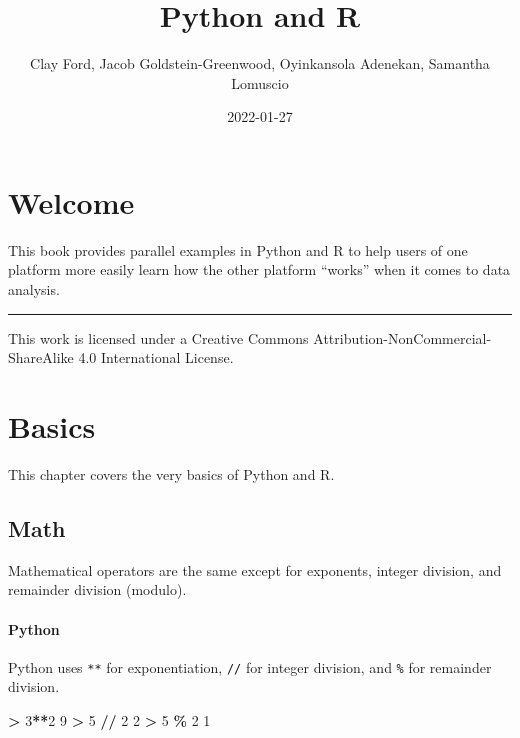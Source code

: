 \documentclass[
]{book}
\title{Python and R}
\author{Clay Ford, Jacob Goldstein-Greenwood, Oyinkansola Adenekan, Samantha Lomuscio}
\date{2022-01-27}
\newenvironment{Shaded}{\begin{snugshade}}{\end{snugshade}}
\newcommand{\DecValTok}[1]{\textcolor[rgb]{0.00,0.00,0.81}{#1}}
\newcommand{\OperatorTok}[1]{\textcolor[rgb]{0.81,0.36,0.00}{\textbf{#1}}}
\begin{document}
\maketitle

{
\setcounter{tocdepth}{1}
\tableofcontents
}
\hypertarget{welcome}{%
\chapter*{Welcome}\label{welcome}}

This book provides parallel examples in Python and R to help users of one platform more easily learn how the other platform ``works'' when it comes to data analysis.

\begin{center}\rule{0.5\linewidth}{0.5pt}\end{center}

This work is licensed under a Creative Commons Attribution-NonCommercial-ShareAlike 4.0 International License.

\hypertarget{basics}{%
\chapter{Basics}\label{basics}}

This chapter covers the very basics of Python and R.

\hypertarget{math}{%
\section{Math}\label{math}}

Mathematical operators are the same except for exponents, integer division, and remainder division (modulo).

\hypertarget{python}{%
\subsubsection*{Python}\label{python}}

Python uses \texttt{**} for exponentiation, \texttt{//} for integer division, and \texttt{\%} for remainder division.

\begin{Shaded}
\begin{Highlighting}[]
\OperatorTok{\textgreater{}} \DecValTok{3}\OperatorTok{**}\DecValTok{2}
\DecValTok{9}
\OperatorTok{\textgreater{}} \DecValTok{5} \OperatorTok{//} \DecValTok{2}
\DecValTok{2}
\OperatorTok{\textgreater{}} \DecValTok{5} \OperatorTok{\%} \DecValTok{2}
\DecValTok{1}
\end{Highlighting}
\end{Shaded}
\end{document}

